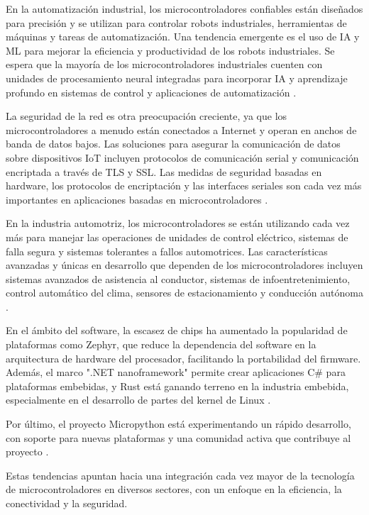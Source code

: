 En la automatización industrial, los microcontroladores confiables están diseñados para precisión y se utilizan para controlar robots industriales, herramientas de máquinas y tareas de automatización. Una tendencia emergente es el uso de IA y ML para mejorar la eficiencia y productividad de los robots industriales. Se espera que la mayoría de los microcontroladores industriales cuenten con unidades de procesamiento neural integradas para incorporar IA y aprendizaje profundo en sistemas de control y aplicaciones de automatización \cite{engineersgarage_microcontrollers_2023}.

La seguridad de la red es otra preocupación creciente, ya que los microcontroladores a menudo están conectados a Internet y operan en anchos de banda de datos bajos. Las soluciones para asegurar la comunicación de datos sobre dispositivos IoT incluyen protocolos de comunicación serial y comunicación encriptada a través de TLS y SSL. Las medidas de seguridad basadas en hardware, los protocolos de encriptación y las interfaces seriales son cada vez más importantes en aplicaciones basadas en microcontroladores \cite{engineersgarage_microcontrollers_2023}.

En la industria automotriz, los microcontroladores se están utilizando cada vez más para manejar las operaciones de unidades de control eléctrico, sistemas de falla segura y sistemas tolerantes a fallos automotrices. Las características avanzadas y únicas en desarrollo que dependen de los microcontroladores incluyen sistemas avanzados de asistencia al conductor, sistemas de infoentretenimiento, control automático del clima, sensores de estacionamiento y conducción autónoma \cite{engineersgarage_microcontrollers_2023}.

En el ámbito del software, la escasez de chips ha aumentado la popularidad de plataformas como Zephyr, que reduce la dependencia del software en la arquitectura de hardware del procesador, facilitando la portabilidad del firmware. Además, el marco ".NET nanoframework" permite crear aplicaciones C# para plataformas embebidas, y Rust está ganando terreno en la industria embebida, especialmente en el desarrollo de partes del kernel de Linux \cite{solwit_future_embedded_systems}.

Por último, el proyecto Micropython está experimentando un rápido desarrollo, con soporte para nuevas plataformas y una comunidad activa que contribuye al proyecto \cite{solwit_future_embedded_systems}.

Estas tendencias apuntan hacia una integración cada vez mayor de la tecnología de microcontroladores en diversos sectores, con un enfoque en la eficiencia, la conectividad y la seguridad.